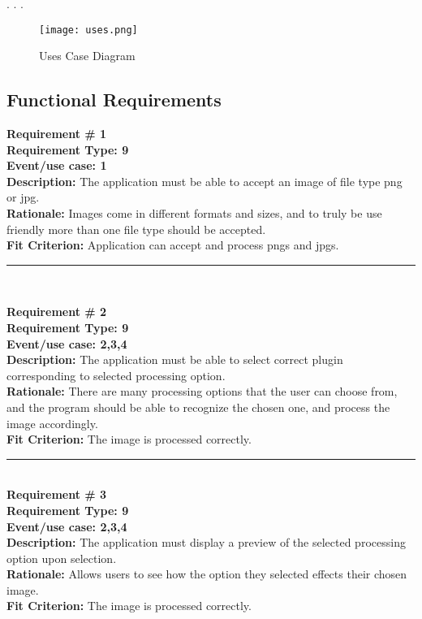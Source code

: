 \documentclass[12pt, titlepage]{article}
\begin{document}
. . .

\begin{figure}[h]
	\texttt{[image: uses.png]}
	\caption{Uses Case Diagram}
	\end{figure}


\subsection{Functional Requirements}

	\textbf{Requirement \# 1}\\
	\textbf{Requirement Type:  9}\\
	\textbf{Event/use case: 1}\\
	\textbf{Description:} The application must be able to accept an image of file type png or jpg.\\
	\textbf{Rationale:} Images come in different formats and sizes, and to truly be use friendly more than one file type should be accepted.\\
	\textbf{Fit Criterion:} Application can accept and process pngs and jpgs.

	\noindent\rule{12cm}{0.4pt} \\ 
	
	\newpage

	\noindent\textbf{Requirement \# 2}\\
	\textbf{Requirement Type: 9}\\
	\textbf{Event/use case: 2,3,4}\\
	\textbf{Description:} The application must be able to select correct plugin corresponding to selected processing option.\\
	\textbf{Rationale:} There are many processing options that the user can choose from, and the program should be able to recognize the chosen one, and process the image accordingly. \\
	\textbf{Fit Criterion:} The image is processed correctly.

	\noindent\rule{12cm}{0.4pt} \\

	\noindent\textbf{Requirement \# 3}\\
	\textbf{Requirement Type: 9}\\
	\textbf{Event/use case: 2,3,4}\\
	\textbf{Description:} The application must display a preview of the selected processing option upon selection.\\
	\textbf{Rationale:} Allows users to see how the option they selected effects their chosen image.\\
	\textbf{Fit Criterion:} The image is processed correctly.\\
\end{document}
